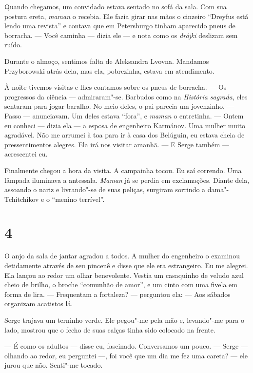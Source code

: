 Quando chegamos, um convidado estava sentado no sofá da sala. Com sua
postura ereta, \emph{maman} o recebia. Ele fazia girar nas mãos o
cinzeiro ``Dreyfus está lendo uma revista'' e contava que em Petersburgo
tinham aparecido pneus de borracha. --- Você caminha --- dizia ele --- e
nota como os \emph{drójki} deslizam sem ruído.

Durante o almoço, sentimos falta de Aleksandra Lvovna. Mandamos
Przyborowski atrás dela, mas ela, pobrezinha, estava em atendimento.

À noite tivemos visitas e lhes contamos sobre os pneus de borracha. ---
Os progressos da ciência --- admiraram"-se. Barbudos como na
\emph{História sagrada}, eles sentaram para jogar baralho. No meio
deles, o pai parecia um jovenzinho. --- Passo --- anunciavam. Um deles
estava ``fora'', e \emph{maman} o entretinha. --- Ontem eu conheci ---
dizia ela --- a esposa de engenheiro Karmánov. Uma mulher muito %
agradável. Não me arrumei à toa para ir à casa dos Belúguin, eu estava
cheia de pressentimentos alegres. Ela irá nos visitar amanhã. --- E
Serge também --- acrescentei eu.

Finalmente chegou a hora da visita. A campainha tocou. Eu saí correndo.
Uma lâmpada iluminava a antessala. \emph{Maman} já se perdia em
exclamações. Diante dela, assoando o nariz e livrando"-se de suas
peliças, surgiram sorrindo a dama"-Tchítchikov e o ``menino terrível''.

\section{4}

O anjo da sala de jantar agradou a todos. A mulher do engenheiro o
examinou detidamente através de seu pincenê e disse que ele era
estrangeiro. Eu me alegrei. Ela lançou ao redor um olhar benevolente.
Vestia um casaquinho de veludo azul cheio de brilho, o broche ``comunhão
de amor'', e um cinto com uma fivela em forma de lira. --- Frequentam a
fortaleza? --- perguntou ela: --- Aos sábados organizam acatistos lá.

Serge trajava um terninho verde. Ele pegou"-me pela mão e, levando"-me
para o lado, mostrou que o fecho de suas calças tinha sido colocado na
frente.

--- É como os adultos --- disse eu, fascinado. Conversamos um pouco. ---
Serge --- olhando ao redor, eu perguntei ---, foi você que um dia me fez
uma careta? --- ele jurou que não. Senti"-me tocado.

